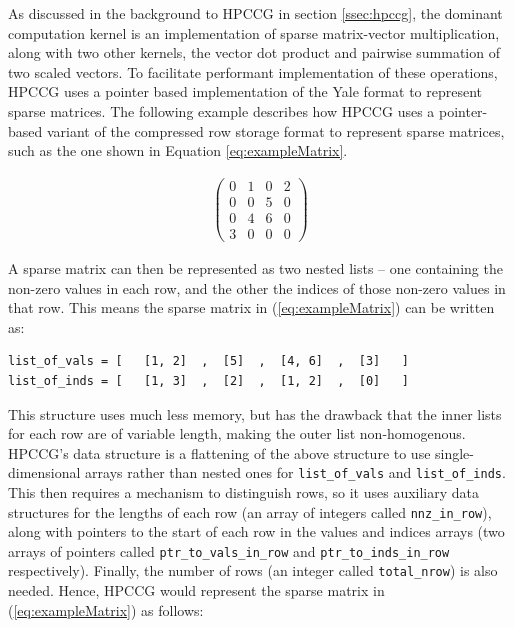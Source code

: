 As discussed in the background to HPCCG in section \ref{ssec:hpccg}, the dominant computation kernel is an implementation of sparse matrix-vector multiplication, along with two other kernels, the vector dot product and pairwise summation of two scaled vectors. To facilitate performant implementation of these operations, HPCCG uses a pointer based implementation of the Yale format to represent sparse matrices. The following example describes how HPCCG uses a pointer-based variant of the compressed row storage format to represent sparse matrices, such as the one shown in Equation \ref{eq:exampleMatrix}.

\begin{align}
    \begin{pmatrix}
        0 & 1 & 0 & 2 \\
        0 & 0 & 5 & 0 \\
        0 & 4 & 6 & 0 \\
        3 & 0 & 0 & 0
    \end{pmatrix}
    \label{eq:exampleMatrix}
\end{align}

A sparse matrix can then be represented as two nested lists -- one containing the non-zero values in each row, and the other the indices of those non-zero values in that row. This means the sparse matrix in (\ref{eq:exampleMatrix}) can be written as:

\begin{verbatim}
list_of_vals = [   [1, 2]  ,  [5]  ,  [4, 6]  ,  [3]   ]
list_of_inds = [   [1, 3]  ,  [2]  ,  [1, 2]  ,  [0]   ]
\end{verbatim}

This structure uses much less memory, but has the drawback that the inner lists for each row are of variable length, making the outer list non-homogenous. HPCCG's data structure is a flattening of the above structure to use single-dimensional arrays rather than nested ones for \texttt{list\_of\_vals} and \texttt{list\_of\_inds}. This then requires a mechanism to distinguish rows, so it uses auxiliary data structures for the lengths of each row (an array of integers called \texttt{nnz\_in\_row}), along with pointers to the start of each row in the values and indices arrays (two arrays of pointers called \texttt{ptr\_to\_vals\_in\_row} and \texttt{ptr\_to\_inds\_in\_row} respectively). Finally, the number of rows (an integer called \texttt{total\_nrow}) is also needed. Hence, HPCCG would represent the sparse matrix in (\ref{eq:exampleMatrix}) as follows:

